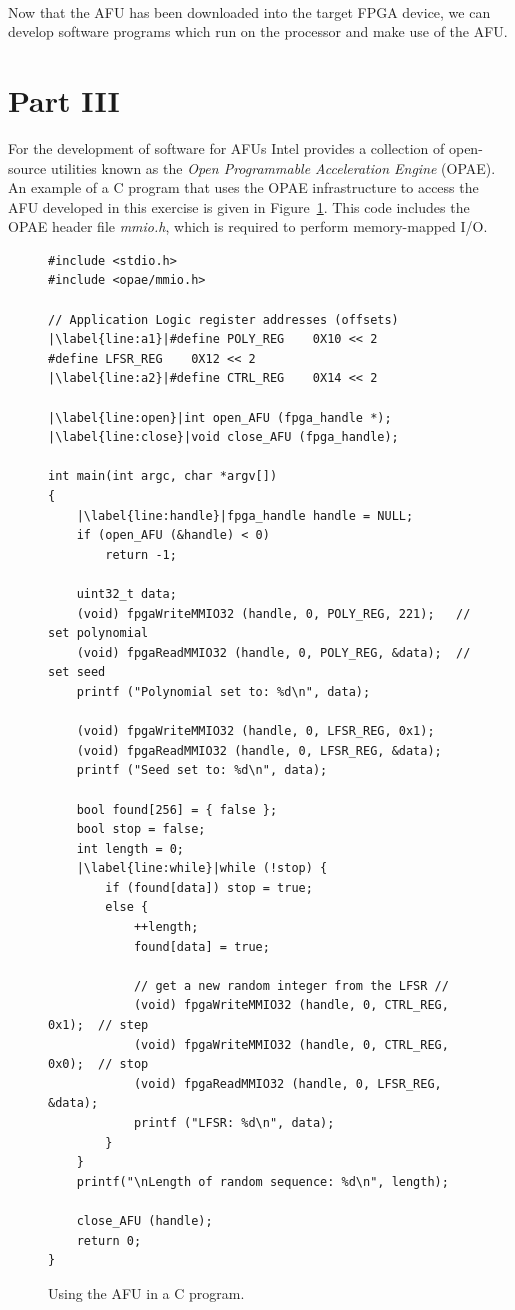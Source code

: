 \documentclass[epsfig,10pt,fullpage]{article}
\begin{document}
~\\
\noindent
Now that the AFU has been downloaded into the target FPGA device, we can develop software 
programs which run on the processor and make use of the AFU.

\section*{Part III}
For the development of software for AFUs Intel provides a collection of open-source
utilities known as the {\it Open Programmable Acceleration Engine} (OPAE).  An example of 
a C program that uses the OPAE infrastructure to access the AFU developed in this exercise 
is given in Figure~\ref{fig:C_code}. This code includes the OPAE header file {\it mmio.h},
which is required to perform memory-mapped I/O.

\lstset{language=C,numbers=left,escapechar=|}
\begin{figure}[H]
\begin{center}
\begin{minipage}[h]{15 cm}
\begin{lstlisting}[name=C_code]
#include <stdio.h>
#include <opae/mmio.h>

// Application Logic register addresses (offsets)
|\label{line:a1}|#define POLY_REG    0X10 << 2
#define LFSR_REG    0X12 << 2
|\label{line:a2}|#define CTRL_REG    0X14 << 2

|\label{line:open}|int open_AFU (fpga_handle *);
|\label{line:close}|void close_AFU (fpga_handle);

int main(int argc, char *argv[])
{
    |\label{line:handle}|fpga_handle handle = NULL;
    if (open_AFU (&handle) < 0)
        return -1;

    uint32_t data;
    (void) fpgaWriteMMIO32 (handle, 0, POLY_REG, 221);   // set polynomial
    (void) fpgaReadMMIO32 (handle, 0, POLY_REG, &data);  // set seed
    printf ("Polynomial set to: %d\n", data);
    
    (void) fpgaWriteMMIO32 (handle, 0, LFSR_REG, 0x1);
    (void) fpgaReadMMIO32 (handle, 0, LFSR_REG, &data);
    printf ("Seed set to: %d\n", data);

    bool found[256] = { false };
    bool stop = false;
    int length = 0;
    |\label{line:while}|while (!stop) {
        if (found[data]) stop = true;
        else {
            ++length;
            found[data] = true;

            // get a new random integer from the LFSR // 
            (void) fpgaWriteMMIO32 (handle, 0, CTRL_REG, 0x1);  // step
            (void) fpgaWriteMMIO32 (handle, 0, CTRL_REG, 0x0);  // stop
            (void) fpgaReadMMIO32 (handle, 0, LFSR_REG, &data);
            printf ("LFSR: %d\n", data);
        }
    }
    printf("\nLength of random sequence: %d\n", length);

    close_AFU (handle);
    return 0;
}
\end{lstlisting}
\end{minipage}
\caption{Using the AFU in a C program.}
\label{fig:C_code}
\end{center}
\end{figure}
\end{document}
